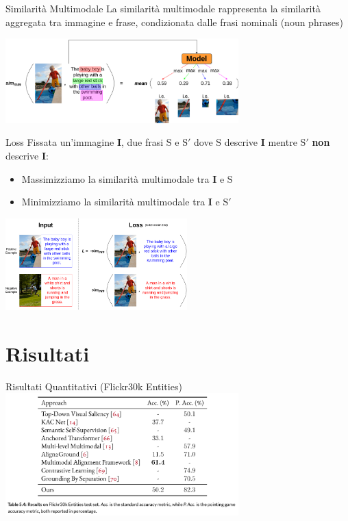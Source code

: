 \documentclass{beamer}
\begin{document}
\begin{frame}{Similarità Multimodale}
  La similarità multimodale rappresenta la \alert{similarità aggregata
  tra immagine e frase}, condizionata dalle frasi nominali (noun
  phrases) \vspace{1cm}

  \centering
  \includegraphics[width=9cm]{images/sim-mm.png}
\end{frame}

\begin{frame}{Loss}
  Fissata un'immagine $\bm{I}$, due frasi $\text{S}$ e $\text{S}'$
  dove $\text{S}$ descrive $\bm{I}$ mentre $\text{S}'$ \textbf{non}
  descrive $\bm{I}$:
  \begin{itemize}
    \item \alert{Massimizziamo} la similarità multimodale tra $\bm{I}$
    e $\text{S}$
    \item \alert{Minimizziamo} la similarità multimodale tra $\bm{I}$
    e $\text{S}'$
  \end{itemize}
  
  \vspace{0.5cm}

  \centering
  \includegraphics[width=7cm]{images/loss.png}
\end{frame}

\section{Risultati}

\begin{frame}{Risultati Quantitativi (Flickr30k Entities)}
  \centering
  \includegraphics[width=9cm]{images/flickr30k-results.png}
\end{frame}
\end{document}
